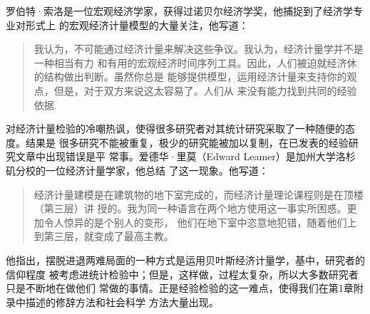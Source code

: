 罗伯特·索洛是一位宏观经济学家，获得过诺贝尔经济学奖，他捕捉到了经济学专业对形式上
的宏观经济计量模型的大量关注，他写道：

\begin{quotation}
  我认为，不可能通过经济计量来解决这些争议。我认为，经济计量学并不是一种相当有力
  和有用的宏观经济时间序列工具。因此，人们被迫就经济休的结构做出判断。虽然你总是
  能够提供模型，运用经济计量来支持你的观点，但是，对于双方来说这太容易了。人们从
  来没有能力找到共同的经验依据.
\end{quotation}

对经济计量检验的冷嘲热讽，使得很多研究者对其统计研究采取了一种随便的态度。结果是
很多研究不能被重复，极少的研究能被加以复制，在已发表的经验研究文章中出现错误是平
常事。爱德华·里莫（Edward Leamer）是加州大学洛杉矶分校的一位经济计量学家，他总结
了这一现象。他写道：

\begin{quotation}
  经济计量建模是在建筑物的地下室完成的，而经济计量理论课程则是在顶楼（第三层）讲
  授的。我为同一种语言在两个地方使用这一事实所困惑。更加令人惊异的是个别人的变形，
  他们在地下室中恣意地犯错，随着他们上到第三层，就变成了最高主教。
\end{quotation}

他指出，摆脱进退两难局面的一种方式是运用贝叶斯经济计量学，基中，研究者的信仰程度
被考虑进统计检验中；但是，这样做，过程太复杂，所以大多数研究者只是不断地在做他们
常做的事情。正是经验检验的这一难点，使得我们在第1章附录中描述的修辞方法和社会科学
方法大量出现。

